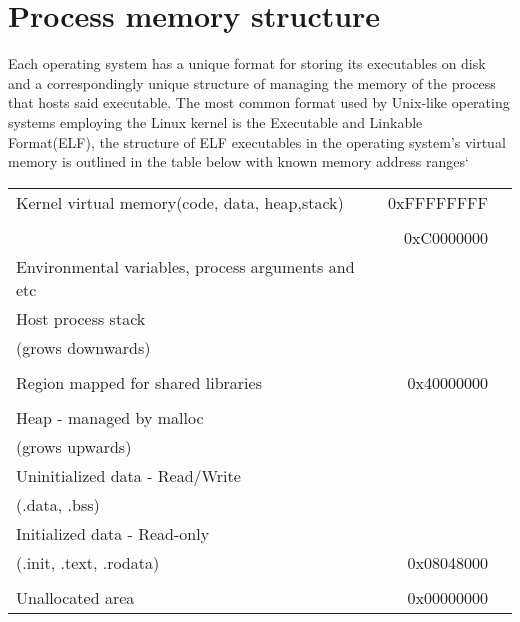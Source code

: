 \documentclass[a4paper,9pt]{report}
\begin{document}
\section{Process memory structure}
\label{sec:orgc2ab067}

Each operating system has a unique format for storing its executables on disk and a correspondingly unique structure of managing the memory of the process that hosts said executable. The most common format used by Unix-like operating systems employing the Linux kernel is the Executable and Linkable Format(ELF), the structure of ELF executables in the operating system's virtual memory is outlined in the table below with known memory address ranges`\\

\begin{center}
\begin{tabular}{l|rl}
\hline
Kernel virtual memory(code, data, heap,stack) & 0xFFFFFFFF & \\
 &  & \\
 & 0xC0000000 & \\
\hline
Environmental variables, process arguments and etc &  & \\
\hline
Host process stack &  & \\
(grows downwards) &  & \\
\hline
 &  & \\
\hline
Region mapped for shared libraries & 0x40000000 & \\
\hline
 &  & \\
\hline
Heap - managed by malloc &  & \\
(grows upwards) &  & \\
\hline
Uninitialized data - Read/Write &  & \\
(.data, .bss) &  & \\
\hline
Initialized data - Read-only &  & \\
(.init, .text, .rodata) & 0x08048000 & \\
\hline
 &  & \\
Unallocated area & 0x00000000 & \\
\hline
\end{tabular}
\end{center}
\end{document}
